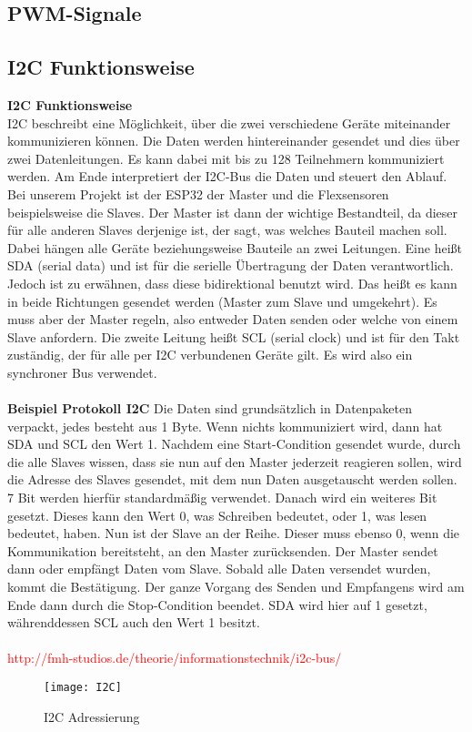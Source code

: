 \documentclass[titlepage,12pt,twoside]{article}
\begin{document}
\subsection{PWM-Signale}
\label{chap:PWM-Signale}

\subsection{I2C Funktionsweise}
\label{chap:I2C Funktionsweise}
\textbf{I2C Funktionsweise}
\\
I2C beschreibt eine Möglichkeit, über die zwei verschiedene Geräte miteinander 
kommunizieren können. Die Daten werden hintereinander gesendet und dies über zwei 
Datenleitungen. Es kann dabei mit bis zu 128 Teilnehmern kommuniziert werden. Am Ende 
interpretiert der I2C-Bus die Daten und steuert den Ablauf. Bei unserem Projekt ist 
der ESP32 der Master und die Flexsensoren beispielsweise die Slaves. Der Master ist 
dann der wichtige Bestandteil, da dieser für alle anderen Slaves derjenige ist, der 
sagt, was welches Bauteil machen soll. Dabei hängen alle Geräte beziehungsweise 
Bauteile an zwei Leitungen. Eine heißt SDA (serial data) und ist für die serielle 
Übertragung der Daten verantwortlich. Jedoch ist zu erwähnen, dass diese bidirektional 
benutzt wird. Das heißt es kann in beide Richtungen gesendet werden (Master zum 
Slave und umgekehrt). Es muss aber der Master regeln, also entweder Daten senden 
oder welche von einem Slave anfordern. Die zweite Leitung heißt SCL (serial clock) 
und ist für den Takt zuständig, der für alle per I2C verbundenen Geräte gilt. Es 
wird also ein synchroner Bus verwendet. \\
\\
\textbf{Beispiel Protokoll I2C}
Die Daten sind grundsätzlich in Datenpaketen verpackt, jedes besteht aus 1 Byte. 
Wenn nichts kommuniziert wird, dann hat SDA und SCL den Wert 1. Nachdem eine 
Start-Condition gesendet wurde, durch die alle Slaves wissen, dass sie nun auf den 
Master jederzeit reagieren sollen, wird die Adresse des Slaves gesendet, mit dem 
nun Daten ausgetauscht werden sollen. 7 Bit werden hierfür standardmäßig verwendet. 
Danach wird ein weiteres Bit gesetzt. Dieses kann den Wert 0, was Schreiben bedeutet, 
oder 1, was lesen bedeutet, haben. Nun ist der Slave an der Reihe. Dieser muss 
ebenso 0, wenn die Kommunikation bereitsteht, an den Master zurücksenden. Der Master 
sendet dann oder empfängt Daten vom Slave. Sobald alle Daten versendet wurden, 
kommt die Bestätigung. Der ganze Vorgang des Senden und Empfangens wird am Ende 
dann durch die Stop-Condition beendet. SDA wird hier auf 1 gesetzt, währenddessen 
SCL auch den Wert 1 besitzt. \\
\\
\textcolor{red}{http://fmh-studios.de/theorie/informationstechnik/i2c-bus/}
\\
\begin{figure}[H]
	\begin{center}
		\scalebox{1.2}
		{\texttt{[image: I2C]}}
		\caption{I2C Adressierung}
		\label{fig:I2C}		
	\end{center}
\end{figure}
\hfill \break
\end{document}
